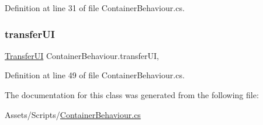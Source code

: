 Definition at line 31 of file Container\+Behaviour.\+cs.

\mbox{\label{class_container_behaviour_adf93ff57ab81d2e86d555aad6a4dbb8c}} 
\subsubsection{\texorpdfstring{transferUI}{transferUI}}
{\footnotesize\ttfamily \mbox{\hyperlink{class_transfer_u_i}{Transfer\+UI}} Container\+Behaviour.\+transfer\+UI\hspace{0.3cm}{\ttfamily [get]}, {\ttfamily [set]}}



Definition at line 49 of file Container\+Behaviour.\+cs.



The documentation for this class was generated from the following file\+:\begin{DoxyCompactItemize}
\item 
Assets/\+Scripts/\mbox{\hyperlink{_container_behaviour_8cs}{Container\+Behaviour.\+cs}}\end{DoxyCompactItemize}
